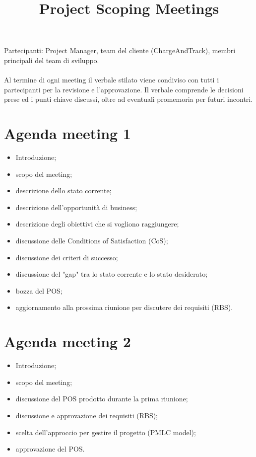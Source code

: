 \documentclass[a4paper,12pt]{article}
\title{\textbf{Project Scoping Meetings}}
\author{}
\date{}
\begin{document}
\maketitle

Partecipanti: Project Manager, team del cliente (ChargeAndTrack), membri principali del team di sviluppo. \\
\\
Al termine di ogni meeting il verbale stilato viene condiviso con tutti i partecipanti per la revisione e
l'approvazione. Il verbale comprende le decisioni prese ed i punti chiave discussi, oltre ad eventuali
promemoria per futuri incontri.

\section*{Agenda meeting 1}
\begin{itemize}
    \item Introduzione;
    \item scopo del meeting;
    \item descrizione dello stato corrente;
    \item descrizione dell'opportunità di business;
    \item descrizione degli obiettivi che si vogliono raggiungere;
    \item discussione delle Conditions of Satisfaction (CoS);
    \item discussione dei criteri di successo;
    \item discussione del "gap" tra lo stato corrente e lo stato desiderato;
    \item bozza del POS;
    \item aggiornamento alla prossima riunione per discutere dei requisiti (RBS).
\end{itemize}

\section*{Agenda meeting 2}
\begin{itemize}
    \item Introduzione;
    \item scopo del meeting;
    \item discussione del POS prodotto durante la prima riunione;
    \item discussione e approvazione dei requisiti (RBS);
    \item scelta dell'approccio per gestire il progetto (PMLC model);
    \item approvazione del POS.
\end{itemize}
\end{document}
